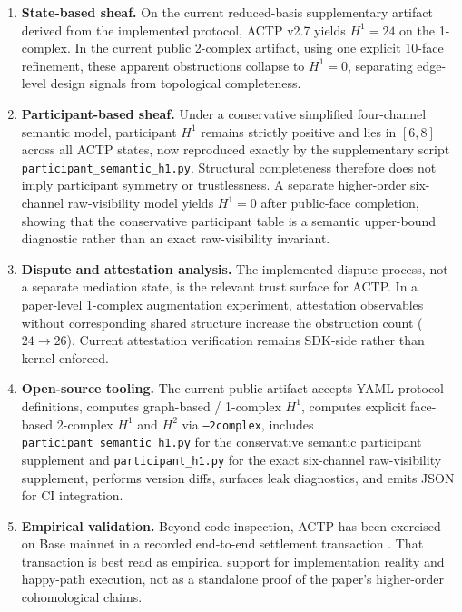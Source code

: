 \documentclass[11pt]{article}
\theoremstyle{plain}
\theoremstyle{definition}
\newcommand{\Hone}{H^{1}}
\newcommand{\Htwo}{H^{2}}
\begin{document}
\begin{enumerate}
  \item \textbf{State-based sheaf.}  On the current reduced-basis
        supplementary artifact derived from the implemented protocol, ACTP
        v2.7 yields $\Hone = 24$ on
        the 1-complex.  In the current public 2-complex artifact, using one
        explicit 10-face refinement, these apparent obstructions collapse to
        $\Hone = 0$, separating edge-level design signals from topological
        completeness.

  \item \textbf{Participant-based sheaf.}  Under a conservative simplified
        four-channel semantic model, participant $\Hone$ remains strictly
        positive and lies in $[6,8]$ across all ACTP states, now reproduced
        exactly by the supplementary script
        \texttt{participant\_semantic\_h1.py}.  Structural completeness
        therefore does not imply participant symmetry or trustlessness.
        A separate higher-order six-channel raw-visibility
        model yields $\Hone = 0$ after public-face completion, showing that
        the conservative participant table is a semantic upper-bound
        diagnostic rather than an exact raw-visibility invariant.

  \item \textbf{Dispute and attestation analysis.}  The implemented dispute
        process, not a separate mediation state, is the relevant trust surface
        for ACTP.  In a paper-level 1-complex augmentation experiment,
        attestation observables without corresponding shared structure increase
        the obstruction count ($24 \rightarrow 26$).  Current attestation
        verification remains SDK-side rather than kernel-enforced.

  \item \textbf{Open-source tooling.}  The current public artifact accepts
        YAML protocol definitions, computes graph-based / 1-complex $\Hone$,
        computes explicit face-based 2-complex $\Hone$ and $\Htwo$ via
        \texttt{--2complex}, includes \texttt{participant\_semantic\_h1.py}
        for the conservative semantic participant supplement and
        \texttt{participant\_h1.py} for the exact six-channel
        raw-visibility supplement, performs version diffs, surfaces leak
        diagnostics, and emits JSON for CI integration.

  \item \textbf{Empirical validation.}  Beyond code inspection, ACTP has been
        exercised on Base mainnet in a recorded end-to-end settlement
        transaction \cite{ACTPmainnettx}.  That transaction is best read as
        empirical support for implementation reality and happy-path execution,
        not as a standalone proof of the paper's higher-order cohomological
        claims.
\end{enumerate}
\end{document}
